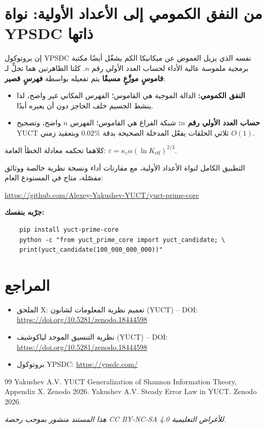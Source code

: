 \documentclass[11pt,a4paper]{article}
\begin{document}
\section{من النفق الكمومي إلى الأعداد الأولية: نواة YPSDC ذاتها}

إن بروتوكول YPSDC نفسه الذي يزيل الغموض عن ميكانيكا الكم
يشغّل أيضًا مكتبة برمجية ملموسة عالية الأداء لحساب العدد
الأولي رقم $n$. كلتا الظاهرتين هما تجلٍّ لـ \textbf{قاموسٍ موزَّعٍ
	مسبقًا} يتم تفعيله بواسطة \textbf{فهرسٍ قصير}:

\begin{itemize}
	\item \textbf{النفق الكمومي:} الدالة الموجية هي القاموس؛ الفهرس
	المكاني غير واضح، لذا ينشط الجسيم خلف الحاجز دون أن
	يعبره أبدًا.
	\item \textbf{حساب العدد الأولي رقم $n$:} شبكة الفراغ هي القاموس؛
	الفهرس $n$ واضح، وتصحیح YUCT ثلاثي الحلقات يفعّل
	المدخلة الصحيحة بدقة $0.02\%$ وبتعقيد زمني $O(1)$.
\end{itemize}

كلاهما تحكمه معادلة الخطأ العامة:
$\varepsilon = \kappa_c\alpha(\ln K_{\mathrm{eff}})^{2/3}$.

التطبيق الكامل لنواة الأعداد الأولية، مع مقارنات أداء
ونسخة نظرية خالصة ووثائق مفصّلة، متاح في المستودع العام:

\begin{center}
	\url{https://github.com/Alexey-Yakushev-YUCT/yuct-prime-core}
\end{center}

\textbf{جرّبه بنفسك:}
\begin{verbatim}
	pip install yuct-prime-core
	python -c "from yuct_prime_core import yuct_candidate; \
	print(yuct_candidate(100_000_000_000))"
\end{verbatim}

	\section{المراجع}
	
	\begin{itemize}
		\item الملحق X: تعميم نظرية المعلومات لشانون (YUCT) -- DOI: \url{https://doi.org/10.5281/zenodo.18444598}
		\item نظرية التنسيق الموحد لياكوشيف (YUCT) -- DOI: \url{https://doi.org/10.5281/zenodo.18444598}
		\item بروتوكول YPSDC: \url{https://ypsdc.com/}
	\end{itemize}
	
	\begin{thebibliography}{99}
		 Yakushev A.V. YUCT Generalization of Shannon Information Theory, Appendix X. Zenodo 2026.
		\bibitem{zenodo.18444599} Yakushev A.V. Steady Error Law in YUCT. Zenodo 2026.
	\end{thebibliography}
	
	\noindent\textit{هذا المستند منشور بموجب رخصة CC BY-NC-SA 4.0 للأغراض التعليمية.}
	
\end{document}

